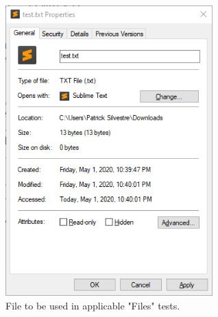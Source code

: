\documentclass[10pt,letterpaper]{article}
\begin{document}
\begin{figure}[h!]
	\centerline{\includegraphics[width=8cm]{screenshots/file-test-file.png}}
	\caption{File to be used in applicable "Files" tests.}
\end{figure}

\newpage
\end{document}
